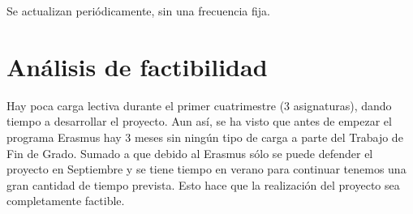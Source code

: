 Se actualizan periódicamente, sin una frecuencia fija.\\


\section{Análisis de factibilidad}

Hay poca carga lectiva durante el primer cuatrimestre (3 asignaturas), dando tiempo a desarrollar el proyecto. Aun así, se ha visto que antes de empezar el programa Erasmus hay 3 meses sin ningún tipo de carga a parte del Trabajo de Fin de Grado. Sumado a que debido al Erasmus sólo se puede defender el proyecto en Septiembre y se tiene tiempo en verano para continuar tenemos una gran cantidad de tiempo prevista. Esto hace que la realización del proyecto sea completamente factible.\\